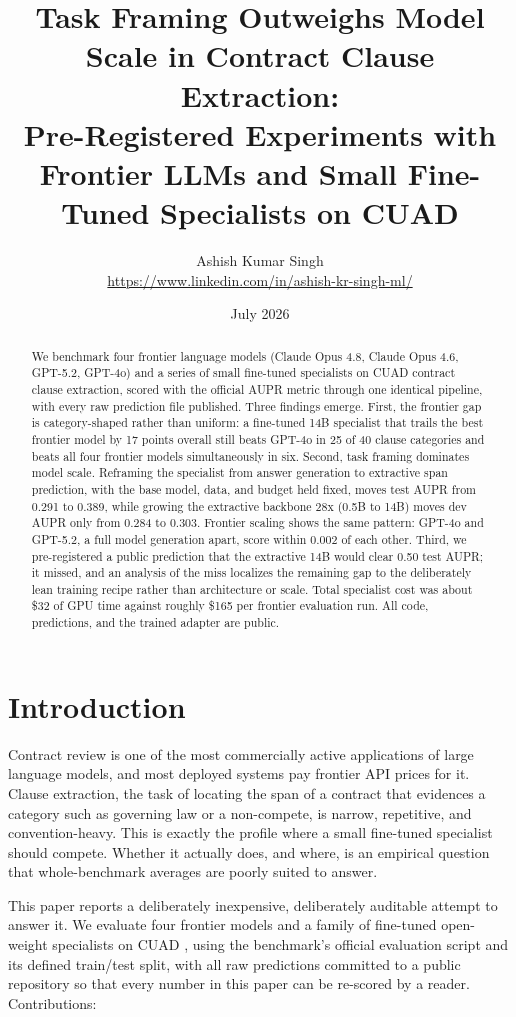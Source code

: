\documentclass[11pt,letterpaper]{article}
\title{Task Framing Outweighs Model Scale in Contract Clause Extraction:\\
Pre-Registered Experiments with Frontier LLMs and Small Fine-Tuned
Specialists on CUAD}
\author{Ashish Kumar Singh\\
\small\url{https://www.linkedin.com/in/ashish-kr-singh-ml/}}
\date{July 2026}
\begin{document}
\maketitle

\begin{abstract}
We benchmark four frontier language models (Claude Opus 4.8, Claude Opus 4.6,
GPT-5.2, GPT-4o) and a series of small fine-tuned specialists on CUAD contract
clause extraction, scored with the official AUPR metric through one identical
pipeline, with every raw prediction file published. Three findings emerge.
First, the frontier gap is category-shaped rather than uniform: a fine-tuned
14B specialist that trails the best frontier model by 17 points overall still
beats GPT-4o in 25 of 40 clause categories and beats all four frontier models
simultaneously in six. Second, task framing dominates model scale. Reframing
the specialist from answer generation to extractive span prediction, with the
base model, data, and budget held fixed, moves test AUPR from 0.291 to 0.389,
while growing the extractive backbone 28x (0.5B to 14B) moves dev AUPR only
from 0.284 to 0.303. Frontier scaling shows the same pattern: GPT-4o and
GPT-5.2, a full model generation apart, score within 0.002 of each other.
Third, we pre-registered a public prediction that the extractive 14B would
clear 0.50 test AUPR; it missed, and an analysis of the miss localizes the
remaining gap to the deliberately lean training recipe rather than
architecture or scale. Total specialist cost was about \$32 of GPU time
against roughly \$165 per frontier evaluation run. All code, predictions, and
the trained adapter are public.
\end{abstract}

\section{Introduction}

Contract review is one of the most commercially active applications of large
language models, and most deployed systems pay frontier API prices for it.
Clause extraction, the task of locating the span of a contract that evidences
a category such as governing law or a non-compete, is narrow, repetitive, and
convention-heavy. This is exactly the profile where a small fine-tuned
specialist should compete. Whether it actually does, and where, is an
empirical question that whole-benchmark averages are poorly suited to answer.

This paper reports a deliberately inexpensive, deliberately auditable attempt
to answer it. We evaluate four frontier models and a family of fine-tuned
open-weight specialists on CUAD \citep{hendrycks2021cuad}, using the
benchmark's official evaluation script and its defined train/test split, with
all raw predictions committed to a public repository so that every number in
this paper can be re-scored by a reader. Contributions:
\end{document}
